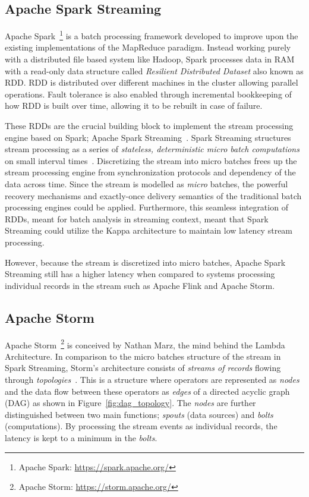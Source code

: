 \subsection{Apache Spark Streaming}%
\label{sub:Apache Spark}
Apache Spark~\footnote{Apache Spark: \url{https://spark.apache.org/}} is a batch 
processing framework developed to improve upon the existing implementations of the 
MapReduce paradigm. Instead working purely with a distributed file based system like 
Hadoop, Spark processes data in RAM with a read-only data structure called 
\emph{Resilient Distributed Dataset} also known as RDD. RDD is distributed over 
different machines in the cluster allowing parallel operations. Fault tolerance 
is also enabled through incremental bookkeeping of how RDD is built over time, allowing 
it to be rebuilt in case of failure.

These RDDs are the crucial building block to implement the stream processing engine 
based on Spark; Apache Spark Streaming~\cite{spark_streaming}. Spark Streaming structures
stream processing as a series of \emph{stateless, deterministic micro batch
computations} on small interval times~\cite{spark_streaming}. Discretizing the stream 
into micro batches frees up the stream processing engine from synchronization protocols 
and dependency of the data across time. Since the stream is modelled as \emph{micro} 
batches, the powerful recovery mechanisms and exactly-once delivery semantics of the traditional batch processing engines could
be applied. 
Furthermore, this seamless integration of RDDs, meant for batch analysis in 
streaming context, meant that Spark Streaming could utilize the Kappa architecture 
to maintain low latency stream processing. 

However, because the stream is discretized into micro batches, Apache Spark Streaming still has a 
higher latency when compared to systems processing individual records in the stream
such as Apache Flink and Apache Storm. 


\subsection{Apache Storm}%
\label{sub:Apache Storm}

Apache Storm~\footnote{Apache Storm: \url{https://storm.apache.org/}} is 
conceived by Nathan Marz, the mind behind the Lambda Architecture. In comparison to 
the micro batches structure of the stream in Spark Streaming, Storm's architecture 
consists of \emph{streams of records} flowing through
\emph{topologies}~\cite{storm_twitter}. This is a structure where operators are 
represented as \emph{nodes} and the data flow between these operators as \emph{edges} of 
a directed acyclic graph (DAG) as shown in Figure~\ref{fig:dag_topology}. 
The \emph{nodes} are further distinguished between 
two main functions; \emph{spouts} (data sources) and \emph{bolts} (computations).  
By processing the stream events as individual records, the latency is kept 
to a minimum in the \emph{bolts}. 

